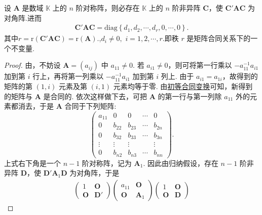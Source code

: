 \documentclass[../../main.tex]{subfiles}%
\begin{document}
\begin{theorem}[对称矩阵的合同标准型]\label{theorem:对称矩阵的合同标准型}
设 $\boldsymbol{A}$ 是数域 $\mathbb{K}$ 上的 $n$ 阶对称阵，则必存在 $\mathbb{K}$ 上的 $n$ 阶非异阵 $\boldsymbol{C}$，使 $\boldsymbol{C}'\boldsymbol{A}\boldsymbol{C}$ 为对角阵.进而
\begin{align*}
\boldsymbol{C}' \boldsymbol{AC}=\mathrm{diag}\left\{ d_1,d_2,\cdots ,d_r,0,\cdots ,0 \right\} .
\end{align*}
其中$r=\mathrm{r}\left( \boldsymbol{C}' \boldsymbol{AC} \right)=\mathrm{r}\left( \boldsymbol{A} \right) .$,$d_i\ne 0,$ $i=1,2,\cdots,r.$即秩 $r$ 是矩阵合同关系下的一个不变量.
\end{theorem}
\begin{proof}

由，不妨设 $\boldsymbol{A}=(a_{ij})$ 中 $a_{11}\neq 0$. 若 $a_{i1}\neq 0$，则可将第一行乘以 $-a_{11}^{-1}a_{i1}$ 加到第 $i$ 行上，再将第一列乘以 $-a_{11}^{-1}a_{i1}$ 加到第 $i$ 列上. 由于 $a_{i1}=a_{1i}$，故得到的矩阵的第 $(1,i)$ 元素及第 $(i,1)$ 元素均等于零. 由\hyperref[lemma:初等合同变换]{初等合同变换}可知，新得到的矩阵与 $\boldsymbol{A}$ 是合同的. 依次这样做下去，可把 $\boldsymbol{A}$ 的第一行与第一列除 $a_{11}$ 外的元素都消去，于是 $\boldsymbol{A}$ 合同于下列矩阵:
\[
\begin{pmatrix}
a_{11} & 0 & 0 & \cdots & 0 \\
0 & b_{22} & b_{23} & \cdots & b_{2n} \\
0 & b_{32} & b_{33} & \cdots & b_{3n} \\
\vdots & \vdots & \vdots & & \vdots \\
0 & b_{n2} & b_{n3} & \cdots & b_{nn}
\end{pmatrix}.
\]
上式右下角是一个 $n - 1$ 阶对称阵，记为 $\boldsymbol{A}_1$. 因此由归纳假设，存在 $n - 1$ 阶非异阵 $\boldsymbol{D}$，使 $\boldsymbol{D}'\boldsymbol{A}_1\boldsymbol{D}$ 为对角阵，于是
\begin{align*}
\begin{pmatrix}
1 & \boldsymbol{O} \\
\boldsymbol{O} & \boldsymbol{D}'
\end{pmatrix}
\begin{pmatrix}
a_{11} & \boldsymbol{O} \\
\boldsymbol{O} & \boldsymbol{A}_1
\end{pmatrix}
\begin{pmatrix}
1 & \boldsymbol{O} \\
\boldsymbol{O} & \boldsymbol{D}

\end{pmatrix}
\end{align*}
\end{proof}
\end{document}

